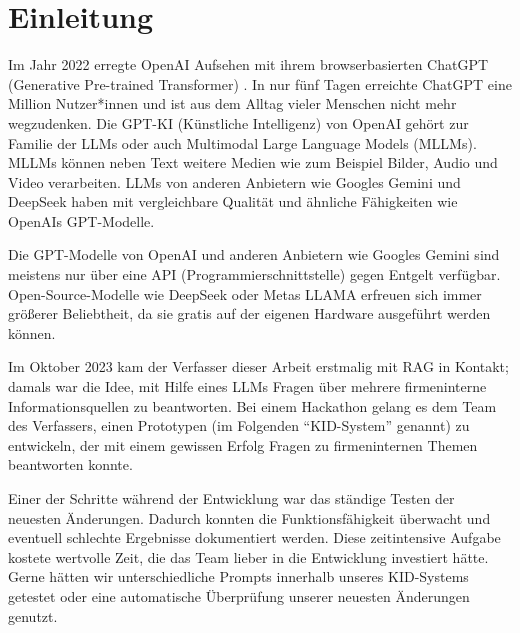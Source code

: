 \chapter{Einleitung}

Im Jahr 2022 erregte OpenAI Aufsehen mit ihrem browserbasierten ChatGPT (Generative Pre-trained Transformer) \cite{2023arXiv230308774O}. In nur fünf Tagen erreichte ChatGPT eine Million Nutzer*innen \cite{doit_software_chatgpt_2025} und ist aus dem Alltag vieler Menschen nicht mehr wegzudenken.
Die GPT-KI (Künstliche Intelligenz) von OpenAI gehört zur Familie der LLMs oder auch Multimodal Large Language Models (MLLMs). MLLMs können neben Text weitere Medien wie zum Beispiel Bilder, Audio und Video verarbeiten.
LLMs von anderen Anbietern wie Googles Gemini \cite{2023arXiv231211805G} und DeepSeek \cite{2025arXiv250112948D} haben mit vergleichbare Qualität und ähnliche Fähigkeiten wie OpenAIs GPT-Modelle.

Die GPT-Modelle von OpenAI und anderen Anbietern wie Googles Gemini \cite{2024arXiv240305530G} sind meistens nur über eine API (Programmierschnittstelle) gegen Entgelt verfügbar.
Open-Source-Modelle wie DeepSeek \cite{2025arXiv250112948D} oder Metas LLAMA \cite{2023arXiv230709288T} erfreuen sich immer größerer Beliebtheit, da sie gratis auf der eigenen Hardware ausgeführt werden können.

Im Oktober 2023 kam der Verfasser dieser Arbeit erstmalig mit RAG in Kontakt; damals war die Idee, mit Hilfe eines LLMs Fragen über mehrere firmeninterne Informationsquellen zu beantworten.
Bei einem Hackathon gelang es dem Team des Verfassers, einen Prototypen (im Folgenden \enquote{KID-System} genannt) zu entwickeln, der mit einem gewissen Erfolg Fragen zu firmeninternen Themen beantworten konnte.

Einer der Schritte während der Entwicklung war das ständige Testen der neuesten Änderungen. Dadurch konnten die Funktionsfähigkeit überwacht und eventuell schlechte Ergebnisse dokumentiert werden.
Diese zeitintensive Aufgabe kostete wertvolle Zeit, die das Team lieber in die Entwicklung investiert hätte.
Gerne hätten wir unterschiedliche Prompts innerhalb unseres KID-Systems getestet oder eine automatische Überprüfung unserer neuesten Änderungen genutzt.


